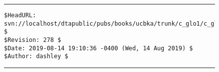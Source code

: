 
\noindent\begin{figure}[!b]
\noindent\rule[-0.25in]{\textwidth}{1pt}
\begin{tiny}
\begin{verbatim}
$HeadURL: svn://localhost/dtapublic/pubs/books/ucbka/trunk/c_glo1/c_glo1.tex $
$Revision: 278 $
$Date: 2019-08-14 19:10:36 -0400 (Wed, 14 Aug 2019) $
$Author: dashley $
\end{verbatim}
\end{tiny}
\noindent\rule[0.25in]{\textwidth}{1pt}
\end{figure}

%
